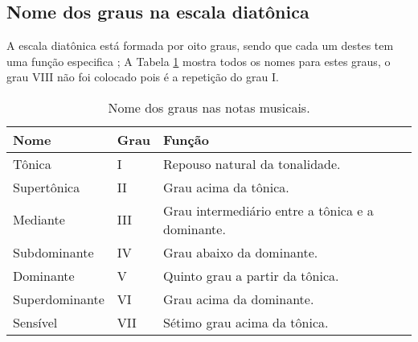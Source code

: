 \subsection{Nome dos graus na escala diatônica}
A escala diatônica está formada por oito graus, 
sendo que cada um destes tem uma função especifica \cite[pp. 31]{cardoso1973curso};
A Tabela \ref{tab:relacaotonica} mostra todos os nomes para estes graus, 
o grau VIII não foi colocado pois é a repetição do grau I. 
\begin{table}[h]
  \centering
  \begin{tabular}{|l|l|p{7cm}|}
  \hline
  Nome           & Grau & Função\\ \hline \hline
  Tônica         & I    & Repouso natural da tonalidade.\\ \hline
  Supertônica    & II   & Grau acima da tônica.\\ \hline 
  Mediante       & III  & Grau intermediário entre a tônica e a dominante.\\ \hline 
  Subdominante   & IV   & Grau abaixo da dominante.\\ \hline 
  Dominante      & V    & Quinto grau a partir da tônica.\\ \hline 
  Superdominante & VI   & Grau acima da dominante.\\ \hline 
  Sensível       & VII  & Sétimo grau acima da tônica. \\ \hline
  \end{tabular}
  \caption{Nome dos graus nas notas musicais.}
  \label{tab:relacaotonica}
\end{table}


